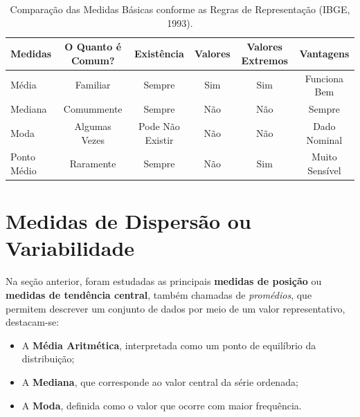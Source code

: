 \begin{table}
\centering
    {
\caption{Comparação das Medidas Básicas conforme as Regras de Representação (IBGE, 1993).}
\label{tabelarotacionada2}
    \vspace{0.2cm}
\begin{tabular}{l|c|c|c|c|c}
\hline
   Medidas  & O Quanto é Comum? & Existência        & Valores & Valores Extremos & Vantagens      \\
\hline\hline
   Média    & Familiar          & Sempre            & Sim              & Sim              & Funciona Bem    \\
   Mediana  & Comummente        & Sempre            & Não              & Não              & Sempre          \\
   Moda     & Algumas Vezes     & Pode Não Existir  & Não              & Não              & Dado Nominal    \\ 
Ponto Médio & Raramente         & Sempre            & Não              & Sim              & Muito Sensível  \\  
   \hline\hline 
\end{tabular}} 
\vspace{-0.5cm} 
\end{table}


\newpage
\section{Medidas de Dispersão ou Variabilidade}

Na seção anterior, foram estudadas as principais \textbf{medidas de posição} ou
\textbf{medidas de tendência central}, também chamadas de \textit{promédios},
que permitem descrever um conjunto de dados por meio de um valor representativo, destacam-se:

\begin{itemize}
    \item A \textbf{Média Aritmética}, interpretada como um ponto de equilíbrio
    da distribuição;
    \item A \textbf{Mediana}, que corresponde ao valor central da série
    ordenada;
    \item A \textbf{Moda}, definida como o valor que ocorre com maior
    frequência.
\end{itemize}

